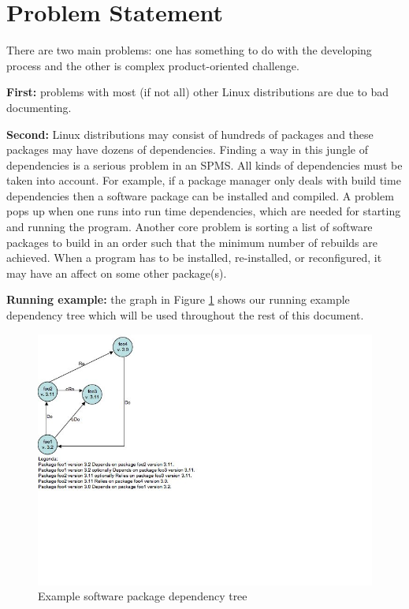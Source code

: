 \section{Problem Statement} \label{sec:problemstatement} 
There are two main problems: one has something to do with the developing process and the other is complex product-oriented challenge.

\textbf{First:} problems with most (if not all) other Linux distributions are due to bad documenting. 

\textbf{Second:} Linux distributions may consist of hundreds of packages and these packages may have dozens of dependencies. Finding a way in this jungle of dependencies is a serious problem in an SPMS. All kinds of dependencies must be taken into account. For example, if a package manager only deals with build time dependencies then a software package can be installed and compiled. A problem pops up when one runs into  run time dependencies, which are needed for starting and running the program. Another core problem is sorting a list of software packages to build in an order such that the minimum number of rebuilds are achieved. When a program has to be installed, re-installed, or reconfigured, it may have an affect on some other package(s).

\textbf{Running example:} the graph in Figure \ref{fig:example} shows our running example dependency tree which will be used throughout the rest of this document.

\begin{figure}
	\centering
	\includegraphics[bb=0 0 720 540]{problem/Slide1.jpg}
	\caption{Example software package dependency tree}
	\label{fig:example}
\end{figure}
